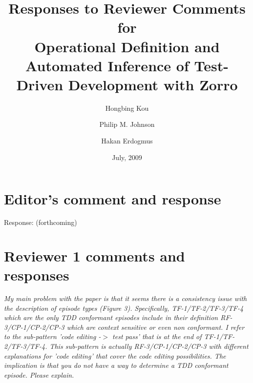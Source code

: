 \documentclass[11pt]{article}
\begin{document}
\title{Responses to Reviewer Comments for \\
Operational Definition and Automated Inference of Test-Driven Development with Zorro}
\author{Hongbing Kou \and Philip M. Johnson \and Hakan Erdogmus}
\date{July, 2009}

\maketitle

\section{Editor's comment and response}



\noindent Response: (forthcoming)


\section{Reviewer 1 comments and responses}


{\noindent \em My main problem with the paper is that it seems there is a consistency issue with the description of episode types (Figure 3). Specifically, TF-1/TF-2/TF-3/TF-4 which are the only TDD conformant episodes include in their definition RF-3/CP-1/CP-2/CP-3 which are context sensitive or even non conformant.  I refer to the sub-pattern 'code editing -$>$ test pass' that is at the end of TF-1/TF-2/TF-3/TF-4. This sub-pattern is actually RF-3/CP-1/CP-2/CP-3 with different explanations for 'code editing' that cover the code editing possibilities. The implication is that you do not have a way to determine a TDD conformant episode. Please explain.}
\end{document}
